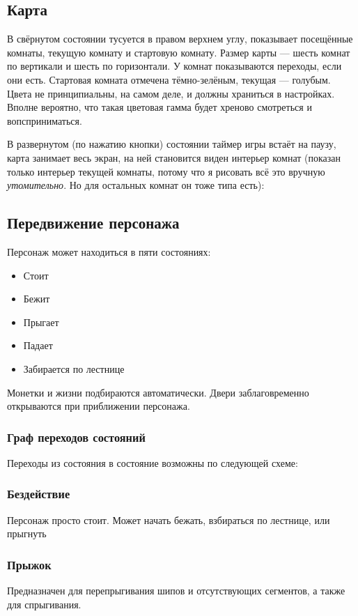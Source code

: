 \documentclass[12pt,a4paper,fullpage]{article}
\begin{document}
\subsection{Карта}
В свёрнутом состоянии тусуется в правом верхнем углу, показывает посещённые комнаты, текущую комнату и стартовую комнату. Размер карты --- шесть комнат по вертикали и шесть по горизонтали. У комнат показываются переходы, если они есть. Стартовая комната отмечена тёмно-зелёным, текущая --- голубым. Цвета не принципиальны, на самом деле, и должны храниться в настройках. Вполне вероятно, что такая цветовая гамма будет хреново смотреться и вопсприниматься.\\

В развернутом (по нажатию кнопки) состоянии таймер игры встаёт на паузу, карта занимает весь экран, на ней становится виден интерьер комнат (показан только интерьер текущей комнаты, потому что я рисовать всё это вручную \textit{утомительно}. Но для остальных комнат он тоже типа есть):\\

\subsection{Передвижение персонажа}
Персонаж может находиться в пяти состояниях:
\begin{itemize}
\item Стоит
\item Бежит
\item Прыгает
\item Падает
\item Забирается по лестнице
\end{itemize}
Монетки и жизни подбираются автоматически. Двери заблаговременно открываются при приближении персонажа.
\subsubsection{Граф переходов состояний}
Переходы из состояния в состояние возможны по следующей схеме:\\

\subsubsection{Бездействие}
Персонаж просто стоит. Может начать бежать, взбираться по лестнице, или прыгнуть
\subsubsection{Прыжок}
Предназначен для перепрыгивания шипов и отсутствующих сегментов, а также для спрыгивания.
\end{document}
